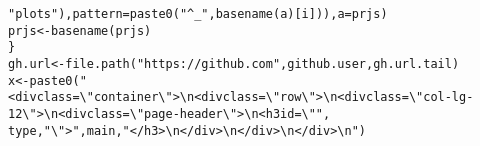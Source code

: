 \documentclass{article}\usepackage[]{graphicx}\usepackage[]{color}
\makeatletter
\newcommand{\hlstr}[1]{\textcolor[rgb]{0.863,0.196,0.184}{#1}}%
\newcommand{\hlstd}[1]{\textcolor[rgb]{0.514,0.58,0.588}{#1}}%
\newcommand{\hlkwb}[1]{\textcolor[rgb]{0.522,0.6,0}{#1}}%
\newcommand{\hlkwc}[1]{\textcolor[rgb]{0.796,0.294,0.086}{#1}}%
\newcommand{\hlkwd}[1]{\textcolor[rgb]{0.576,0.631,0.631}{#1}}%
\newenvironment{kframe}{%
 \def\at@end@of@kframe{}%
 \ifinner\ifhmode%
  \def\at@end@of@kframe{\end{minipage}}%
  \begin{minipage}{\columnwidth}%
 \fi\fi%
 \def\FrameCommand##1{\hskip\@totalleftmargin \hskip-\fboxsep
 \colorbox{shadecolor}{##1}\hskip-\fboxsep
     \hskip-\linewidth \hskip-\@totalleftmargin \hskip\columnwidth}%
 \MakeFramed {\advance\hsize-\width
   \@totalleftmargin\z@ \linewidth\hsize
   \@setminipage}}%
 {\par\unskip\endMakeFramed%
 \at@end@of@kframe}
\newenvironment{knitrout}{}{} %
\makeatother
\begin{document}
\begin{knitrout}
\begin{kframe}
\begin{alltt}
            \hlstr{"plots"}\hlstd{),} \hlkwc{pattern} \hlstd{=} \hlkwd{paste0}\hlstd{(}\hlstr{"^_"}\hlstd{,} \hlkwd{basename}\hlstd{(a)[i])),} \hlkwc{a} \hlstd{= prjs)}
        \hlstd{prjs} \hlkwb{<-} \hlkwd{basename}\hlstd{(prjs)}
    \hlstd{\}}
    \hlstd{gh.url} \hlkwb{<-} \hlkwd{file.path}\hlstd{(}\hlstr{"https://github.com"}\hlstd{, github.user, gh.url.tail)}
    \hlstd{x} \hlkwb{<-} \hlkwd{paste0}\hlstd{(}\hlstr{"<div class=\textbackslash{}"container\textbackslash{}">\textbackslash{}n  <div class=\textbackslash{}"row\textbackslash{}">\textbackslash{}n    <div class=\textbackslash{}"col-lg-12\textbackslash{}">\textbackslash{}n      <div class=\textbackslash{}"page-header\textbackslash{}">\textbackslash{}n        <h3 id=\textbackslash{}""}\hlstd{,}
        \hlstd{type,} \hlstr{"\textbackslash{}">"}\hlstd{, main,} \hlstr{"</h3>\textbackslash{}n      </div>\textbackslash{}n    </div>\textbackslash{}n  </div>\textbackslash{}n  "}\hlstd{)}


\end{alltt}
\end{kframe}
\end{knitrout}
\end{document}
